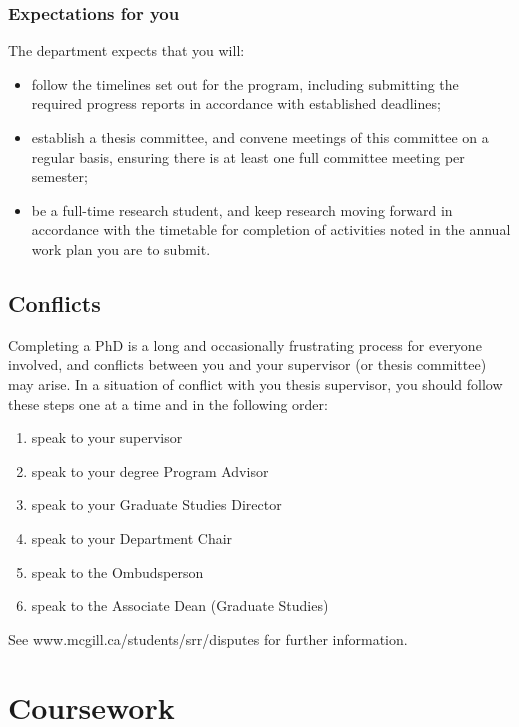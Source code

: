 \documentclass[
  openany]{book}
\providecommand{\tightlist}{%
  \setlength{\itemsep}{0pt}\setlength{\parskip}{0pt}}
\begin{document}
\hypertarget{expectations-for-you}{%
\subsection{Expectations for you}\label{expectations-for-you}}

The department expects that you will:

\begin{itemize}
\tightlist
\item
  follow the timelines set out for the program, including submitting the required progress reports in accordance with established deadlines;
\item
  establish a thesis committee, and convene meetings of this committee on a regular basis, ensuring there is at least one full committee meeting per semester;
\item
  be a full-time research student, and keep research moving forward in accordance with the timetable for completion of activities noted in the annual work plan you are to submit.
\end{itemize}

\hypertarget{conflicts}{%
\section{Conflicts}\label{conflicts}}

Completing a PhD is a long and occasionally frustrating process for everyone involved, and conflicts between you and your supervisor (or thesis committee) may arise. In a situation of conflict with you thesis supervisor, you should follow these steps one at a time and in the following order:

\begin{enumerate}
\def\labelenumi{\arabic{enumi}.}
\tightlist
\item
  speak to your supervisor
\item
  speak to your degree Program Advisor
\item
  speak to your Graduate Studies Director
\item
  speak to your Department Chair
\item
  speak to the Ombudsperson
\item
  speak to the Associate Dean (Graduate Studies)
\end{enumerate}

See www.mcgill.ca/students/srr/disputes for further information.

\hypertarget{coursework}{%
\chapter{Coursework}\label{coursework}}
\end{document}
